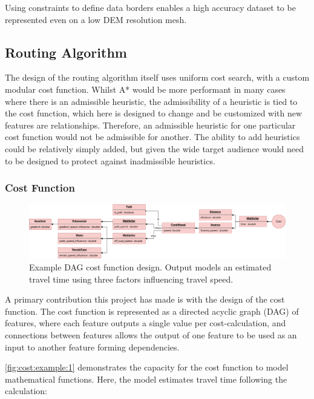 \documentclass[12pt]{article}
\begin{document}
Using constraints to define data borders enables a high accuracy dataset to be represented even on a low DEM resolution mesh.

\subsection{Routing Algorithm}

The design of the routing algorithm itself uses uniform cost search, with a custom modular cost function. Whilst A* would be more performant in many cases where there is an admissible heuristic, the admissibility of a heuristic is tied to the cost function, which here is designed to change and be customized with new features are relationships. Therefore, an admissible heuristic for one particular cost function would not be admissible for another. The ability to add heuristics could be relatively simply added, but given the wide target audience would need to be designed to protect against inadmissible heuristics.

\subsubsection{Cost Function}

\begin{figure}[!htbp]
  \centering
  \includegraphics[width=\textwidth]{assets/costfunction-example1.png}
  \caption{Example DAG cost function design. Output models an estimated travel time using three factors influencing travel speed.}\label{fig:cost:example:1}
\end{figure}

A primary contribution this project has made is with the design of the cost function. The cost function is represented as a directed acyclic graph (DAG) of features, where each feature outputs a single value per cost-calculation, and connections between features allows the output of one feature to be used as an input to another feature forming dependencies.


\autoref{fig:cost:example:1} demonstrates the capacity for the cost function to model mathematical functions. Here, the model estimates travel time following the calculation:
\end{document}

